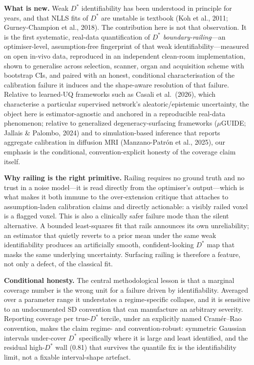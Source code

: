 \documentclass[11pt]{article}
\newcommand{\Dstar}{\ensuremath{D^{*}}}
\begin{document}
\textbf{What is new.} Weak \Dstar{} identifiability has been understood in principle for
years, and that NLLS fits of \Dstar{} are unstable is textbook (Koh et al., 2011;
Gurney-Champion et al., 2018). The contribution here is not that observation. It is the
first systematic, real-data quantification of \Dstar{} \emph{boundary-railing}---an
optimiser-level, assumption-free fingerprint of that weak identifiability---measured on
open in-vivo data, reproduced in an independent clean-room implementation, shown to
generalise across selection, scanner, organ and acquisition scheme with bootstrap CIs,
and paired with an honest, conditional characterisation of the calibration failure it
induces and the shape-aware resolution of that failure. Relative to learned-UQ frameworks
such as Casali et al.\ (2026), which characterise a particular supervised network's
aleatoric/epistemic uncertainty, the object here is estimator-agnostic and anchored in a
reproducible real-data phenomenon; relative to generalized degeneracy-surfacing
frameworks ($\mu$GUIDE; Jallais \& Palombo, 2024) and to simulation-based inference that
reports aggregate calibration in diffusion MRI (Manzano-Patr\'on et al., 2025), our
emphasis is the conditional, convention-explicit honesty of the coverage claim itself.

\textbf{Why railing is the right primitive.} Railing requires no ground truth and no
trust in a noise model---it is read directly from the optimiser's output---which is what
makes it both immune to the over-extension critique that attaches to assumption-laden
calibration claims and directly actionable: a visibly railed voxel is a flagged voxel.
This is also a clinically safer failure mode than the silent alternative. A bounded
least-squares fit that rails announces its own unreliability; an estimator that quietly
reverts to a prior mean under the same weak identifiability produces an artificially
smooth, confident-looking \Dstar{} map that masks the same underlying uncertainty.
Surfacing railing is therefore a feature, not only a defect, of the classical fit.

\textbf{Conditional honesty.} The central methodological lesson is that a marginal
coverage number is the wrong unit for a failure driven by identifiability. Averaged over
a parameter range it understates a regime-specific collapse, and it is sensitive to an
undocumented SD convention that can manufacture an arbitrary severity. Reporting coverage
per true-\Dstar{} tercile, under an explicitly named Cram\'er--Rao convention, makes the
claim regime- and convention-robust: symmetric Gaussian intervals under-cover \Dstar{}
specifically where it is large and least identified, and the residual high-\Dstar{} wall
(0.81) that survives the quantile fix is the identifiability limit, not a fixable
interval-shape artefact.
\end{document}
